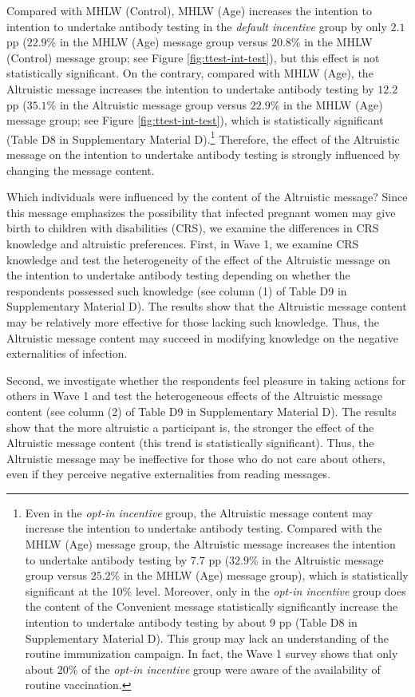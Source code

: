 \documentclass[
      12pt,
    a4paper
]{article}
\begin{document}
Compared with MHLW (Control), MHLW (Age) increases the intention to intention to undertake antibody testing in the \emph{default incentive} group by only \(2.1\) pp (\(22.9\)\% in the MHLW (Age) message group versus \(20.8\)\% in the MHLW (Control) message group; see Figure \ref{fig:ttest-int-test}), but this effect is not statistically significant. On the contrary, compared with MHLW (Age), the Altruistic message increases the intention to undertake antibody testing by \(12.2\) pp (\(35.1\)\% in the Altruistic message group versus \(22.9\)\% in the MHLW (Age) message group; see Figure \ref{fig:ttest-int-test}), which is statistically significant (Table D8 in Supplementary Material D).\footnote{Even in the \emph{opt-in incentive} group, the Altruistic message content may increase the intention to undertake antibody testing. Compared with the MHLW (Age) message group, the Altruistic message increases the intention to undertake antibody testing by \(7.7\) pp (\(32.9\)\% in the Altruistic message group versus \(25.2\)\% in the MHLW (Age) message group), which is statistically significant at the 10\% level. Moreover, only in the \emph{opt-in incentive} group does the content of the Convenient message statistically significantly increase the intention to undertake antibody testing by about 9 pp (Table D8 in Supplementary Material D). This group may lack an understanding of the routine immunization campaign. In fact, the Wave 1 survey shows that only about 20\% of the \emph{opt-in incentive} group were aware of the availability of routine vaccination.} Therefore, the effect of the Altruistic message on the intention to undertake antibody testing is strongly influenced by changing the message content.

Which individuals were influenced by the content of the Altruistic message? Since this message emphasizes the possibility that infected pregnant women may give birth to children with disabilities (CRS), we examine the differences in CRS knowledge and altruistic preferences. First, in Wave 1, we examine CRS knowledge and test the heterogeneity of the effect of the Altruistic message on the intention to undertake antibody testing depending on whether the respondents possessed such knowledge (see column (1) of Table D9 in Supplementary Material D). The results show that the Altruistic message content may be relatively more effective for those lacking such knowledge. Thus, the Altruistic message content may succeed in modifying knowledge on the negative externalities of infection.

Second, we investigate whether the respondents feel pleasure in taking actions for others in Wave 1 and test the heterogeneous effects of the Altruistic message content (see column (2) of Table D9 in Supplementary Material D). The results show that the more altruistic a participant is, the stronger the effect of the Altruistic message content (this trend is statistically significant). Thus, the Altruistic message may be ineffective for those who do not care about others, even if they perceive negative externalities from reading messages.
\end{document}
